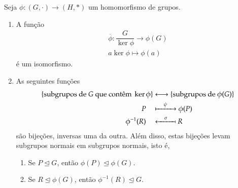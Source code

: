 \begin{teorema}\label{teorema_isomorfismo}
	Seja $\phi : (G, \cdot) \to (H, *)$ um homomorfismo de grupos.
	\begin{enumerate}
		\item A fun\c{c}\~ao
		\begin{align*}
			\overline{\phi} : \dfrac{G}{\ker\phi} \to \phi(G)\\
			a\ker\phi \mapsto \phi(a)
		\end{align*}
		\'e um isomorfismo.
		\item As seguintes fun\c{c}\~oes
		\begin{align*}
			\{\mbox{subgrupos de } G \mbox{ que cont\^em } \ker\phi\} &\longleftrightarrow \{\mbox{subgrupos de } \phi(G)\}\\
			P\quad &\xmapsto{\quad\psi\quad} \phi(P)\\
			\phi^{-1}(R)\quad &\xmapsfrom{\quad\sigma\quad} R
		\end{align*}
		s\~ao bije\c{c}\~oes, inversas uma da outra. Al\'em disso, estas bije\c{c}\~oes levam subgrupos normais em subgrupos normais, isto \'e,
		\begin{enumerate}
			\item Se $P \unlhd G$, ent\~ao $\phi(P) \unlhd \phi(G)$.
			\item Se $R \unlhd \phi(G)$, ent\~ao $\phi^{-1}(R) \unlhd G$.
		\end{enumerate}
	\end{enumerate}
\end{teorema}
